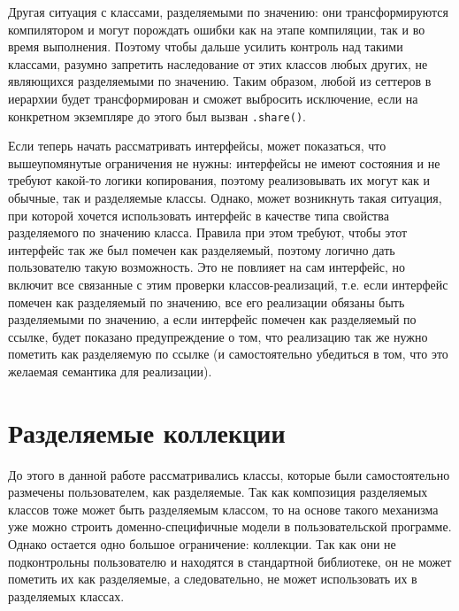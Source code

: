 \documentclass[specification,annotation,times]{itmo-student-thesis}
\newcommand{\todo}[1]{\textbf{TODO}} %
\begin{document}
 Другая ситуация с классами, разделяемыми по значению: они трансформируются компилятором и могут порождать ошибки как на этапе компиляции, так и во время выполнения.
 Поэтому чтобы дальше усилить контроль над такими классами, разумно запретить наследование от этих классов любых других, не являющихся разделяемыми по значению. Таким образом, любой из сеттеров в иерархии будет трансформирован и сможет выбросить исключение, если на конкретном экземпляре до этого был вызван \texttt{.share()}.
 
 Если теперь начать рассматривать интерфейсы, может показаться, что вышеупомянутые ограничения не нужны: интерфейсы не имеют состояния и не требуют какой-то логики копирования, поэтому реализовывать их могут как и обычные, так и разделяемые классы.
 Однако, может возникнуть такая ситуация, при которой хочется использовать интерфейс в качестве типа свойства разделяемого по значению класса.
 Правила при этом требуют, чтобы этот интерфейс так же был помечен как разделяемый, поэтому логично дать пользователю такую возможность.
 Это не повлияет на сам интерфейс, но включит все связанные с этим проверки классов-реализаций, т.е. если интерфейс помечен как разделяемый по значению, все его реализации обязаны быть разделяемыми по значению, а если интерфейс помечен как разделяемый по ссылке, будет показано предупреждение о том, что реализацию так же нужно пометить как разделяемую по ссылке (и самостоятельно убедиться в том, что это желаемая семантика для реализации).




\section{Разделяемые коллекции}\label{collections}

%

До этого в данной работе рассматривались классы, которые были самостоятельно размечены пользователем, как разделяемые.
Так как композиция разделяемых классов тоже может быть разделяемым классом, то на основе такого механизма уже можно строить доменно-специфичные модели в пользовательской программе.
Однако остается одно большое ограничение: коллекции. Так как они не подконтрольны пользователю и находятся в стандартной библиотеке, он не может пометить их как разделяемые, а следовательно, не может использовать их в разделяемых классах.
\end{document}
